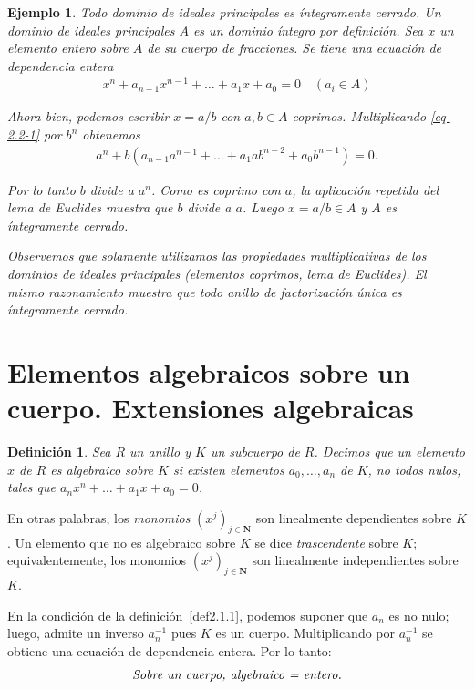 \documentclass[10pt,oneside,bibtotoc,smallheadings,leqno,a5paper,DIV=12]{scrbook}
\newcommand{\NN}{\mathbf{N}}
\numberwithin{equation}{section}
\newenvironment{comm}%
	{\begin{trivlist}\item\small\itshape}
	{\end{trivlist}}
\theoremstyle{defi}
\newtheorem*{definition*}{Definici\'on}
\theoremstyle{enonce}
\theoremstyle{rem}
\newtheorem{example}{Ejemplo}
\numberwithin{theorem}{section}
\numberwithin{proposition}{section}
\numberwithin{definition}{section}
\numberwithin{lemma}{section}
\numberwithin{corollary}{section}
\numberwithin{example}{section}
\numberwithin{footnote}{section}%
\begin{document}
\begin{example}{\itshape Todo dominio de ideales principales es \'integramente cerrado.}
Un dominio de ideales principales $A$ es un dominio \'integro por definici\'on. Sea $x$
un elemento entero sobre $A$ de su cuerpo de fracciones. Se tiene una ecuaci\'on de dependencia
entera
\begin{gather}\label{eq-2.2-1}
x^{n}+a_{n-1}x^{n-1}+\dots+a_{1}x+a_{0}=0\quad(a_{i}\in A)
\end{gather}

Ahora bien, podemos escribir $x = a/b$ con $a,b\in A$ {\em coprimos.} Multiplicando \eqref{eq-2.2-1}
por $b^{n}$ obtenemos
\begin{gather*}
a^{n}+b(a_{n-1}a^{n-1}+\dots+a_{1}ab^{n-2}+a_{0}b^{n-1}) = 0.
\end{gather*}

Por lo tanto $b$ divide a $a^{n}$. Como es coprimo con $a$, la aplicaci\'on repetida del lema de Euclides
muestra que $b$ divide a $a$. Luego $x = a/b\in A$ y $A$ es \'integramente cerrado.
\end{example}

\begin{comm}
Observemos que solamente utilizamos las propiedades multiplicativas de los dominios de ideales principales
(elementos coprimos, lema de Euclides). El mismo razonamiento muestra que todo anillo de {\em factorizaci\'on
\'unica} es \'integramente cerrado.
\end{comm}

\section{Elementos algebraicos sobre un cuerpo. Extensiones algebraicas}
\label{sec2.3}

\begin{definition*}
Sea $R$ un anillo y $K$ un subcuerpo de $R$. Decimos que un elemento $x$ de $R$ es \emph{algebraico sobre $K$} si
existen elementos $a_{0},\dots,a_{n}$ de $K$, no todos nulos, tales que $a_{n}x^{n}+\dots+a_{1}x+a_{0}=0$.
\end{definition*}

En otras palabras, los {\em monomios} $(x^{j})_{j\in\NN}$ son linealmente dependientes sobre $K$.
Un elemento que no es algebraico sobre $K$ se dice {\em trascendente} sobre $K$; equivalentemente, los
monomios $(x^{j})_{j\in\NN}$ son linealmente independientes sobre $K$.

En la condici\'on de la definici\'on~\ref{def2.1.1},
podemos suponer que $a_{n}$ es no nulo; luego, admite un inverso
$a_{n}^{-1}$ pues $K$ es un cuerpo. Multiplicando por $a_{n}^{-1}$ se obtiene una
ecuaci\'on de dependencia entera. Por lo tanto:
\begin{gather}
\text{\itshape Sobre un cuerpo, algebraico = entero.}
\end{gather}
\end{document}
